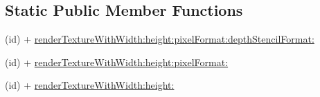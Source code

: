 \subsection*{Static Public Member Functions}
\begin{DoxyCompactItemize}
\item 
(id) + \hyperlink{class_c_c_render_texture_ae93eca7af88866612ea3eba0dc580e9a}{render\-Texture\-With\-Width\-:height\-:pixel\-Format\-:depth\-Stencil\-Format\-:}
\item 
(id) + \hyperlink{class_c_c_render_texture_a6f38823a12f4eaab8246ef55c66fea81}{render\-Texture\-With\-Width\-:height\-:pixel\-Format\-:}
\item 
(id) + \hyperlink{class_c_c_render_texture_a7fd1516f97823568c33872227a859336}{render\-Texture\-With\-Width\-:height\-:}
\end{DoxyCompactItemize}
